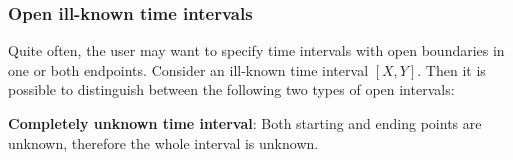 % 




\subsubsection{\label{subsubsec:open-interval}Open ill-known time intervals}
Quite often, the user may want to specify time intervals with open boundaries in one or both endpoints. Consider an ill-known time interval $\left[X, Y\right]$. Then it is possible to distinguish between the following two types of open intervals:
\begin{definition}
\textbf{Completely unknown time interval}: Both starting and ending points are unknown, therefore the whole interval is unknown.
\end{definition}

